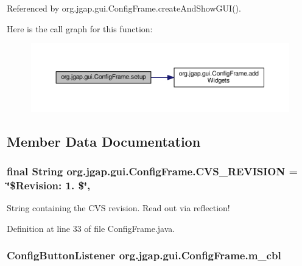 Referenced by org.\-jgap.\-gui.\-Config\-Frame.\-create\-And\-Show\-G\-U\-I().



Here is the call graph for this function\-:
\nopagebreak
\begin{figure}[H]
\begin{center}
\leavevmode
\includegraphics[width=350pt]{classorg_1_1jgap_1_1gui_1_1_config_frame_a0a1cbfde1ac15b4f66808b90de97e071_cgraph}
\end{center}
\end{figure}




\subsection{Member Data Documentation}
\hypertarget{classorg_1_1jgap_1_1gui_1_1_config_frame_abba63494bd015323046f7d491c3ca872}{
\subsubsection[{C\-V\-S\-\_\-\-R\-E\-V\-I\-S\-I\-O\-N}]{\setlength{\rightskip}{0pt plus 5cm}final String org.\-jgap.\-gui.\-Config\-Frame.\-C\-V\-S\-\_\-\-R\-E\-V\-I\-S\-I\-O\-N = \char`\"{}\$Revision\-: 1. \$\char`\"{}\hspace{0.3cm}{\ttfamily [static]}, {\ttfamily [private]}}}\label{classorg_1_1jgap_1_1gui_1_1_config_frame_abba63494bd015323046f7d491c3ca872}
String containing the C\-V\-S revision. Read out via reflection! 

Definition at line 33 of file Config\-Frame.\-java.

\hypertarget{classorg_1_1jgap_1_1gui_1_1_config_frame_a517b0fcc9053a7e49526c06b35207761}{
\subsubsection[{m\-\_\-cbl}]{\setlength{\rightskip}{0pt plus 5cm}Config\-Button\-Listener org.\-jgap.\-gui.\-Config\-Frame.\-m\-\_\-cbl\hspace{0.3cm}{\ttfamily [private]}}}\label{classorg_1_1jgap_1_1gui_1_1_config_frame_a517b0fcc9053a7e49526c06b35207761}


